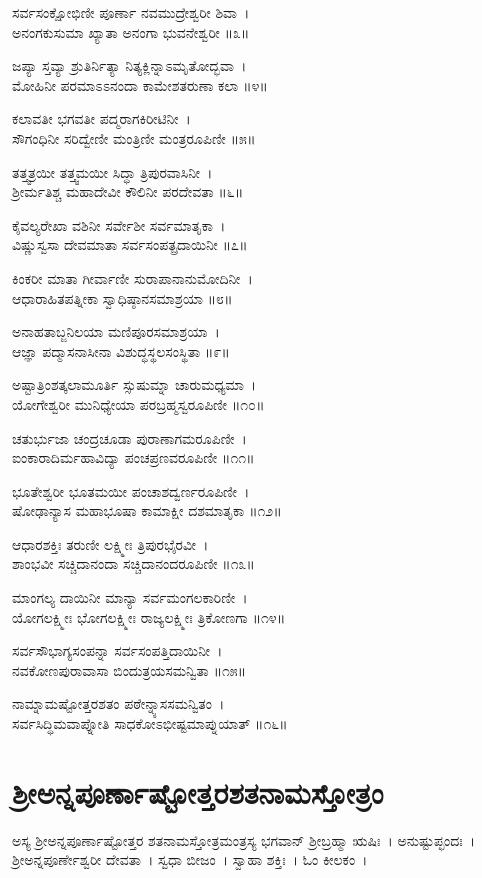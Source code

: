 ಸರ್ವಸಂಕ್ಷೋಭಿಣೀ ಪೂರ್ಣಾ ನವಮುದ್ರೇಶ್ವರೀ ಶಿವಾ~।\\
ಅನಂಗಕುಸುಮಾ ಖ್ಯಾತಾ ಅನಂಗಾ ಭುವನೇಶ್ವರೀ ॥೩॥

ಜಪ್ಯಾ ಸ್ತವ್ಯಾ ಶ್ರುತಿರ್ನಿತ್ಯಾ ನಿತ್ಯಕ್ಲಿನ್ನಾಽಮೃತೋದ್ಭವಾ~।\\
ಮೋಹಿನೀ ಪರಮಾಽಽನಂದಾ ಕಾಮೇಶತರುಣಾ ಕಲಾ ॥೪॥

ಕಲಾವತೀ ಭಗವತೀ ಪದ್ಮರಾಗಕಿರೀಟಿನೀ~।\\
ಸೌಗಂಧಿನೀ ಸರಿದ್ವೇಣೀ ಮಂತ್ರಿಣೀ ಮಂತ್ರರೂಪಿಣೀ ॥೫॥

ತತ್ತ್ವತ್ರಯೀ ತತ್ತ್ವಮಯೀ ಸಿದ್ಧಾ ತ್ರಿಪುರವಾಸಿನೀ~।\\
ಶ್ರೀರ್ಮತಿಶ್ಚ ಮಹಾದೇವೀ ಕೌಲಿನೀ ಪರದೇವತಾ ॥೬॥

ಕೈವಲ್ಯರೇಖಾ ವಶಿನೀ ಸರ್ವೇಶೀ ಸರ್ವಮಾತೃಕಾ~।\\
ವಿಷ್ಣುಸ್ವಸಾ ದೇವಮಾತಾ ಸರ್ವಸಂಪತ್ಪ್ರದಾಯಿನೀ ॥೭॥

ಕಿಂಕರೀ ಮಾತಾ ಗೀರ್ವಾಣೀ ಸುರಾಪಾನಾನುಮೋದಿನೀ~।\\
ಆಧಾರಾಹಿತಪತ್ನೀಕಾ ಸ್ವಾಧಿಷ್ಠಾನಸಮಾಶ್ರಯಾ ॥೮॥

ಅನಾಹತಾಬ್ಜನಿಲಯಾ ಮಣಿಪೂರಸಮಾಶ್ರಯಾ~।\\
ಆಜ್ಞಾ ಪದ್ಮಾಸನಾಸೀನಾ ವಿಶುದ್ಧಸ್ಥಲಸಂಸ್ಥಿತಾ ॥೯॥

ಅಷ್ಟಾತ್ರಿಂಶತ್ಕಲಾಮೂರ್ತಿ ಸ್ಸುಷುಮ್ನಾ ಚಾರುಮಧ್ಯಮಾ~।\\
ಯೋಗೇಶ್ವರೀ ಮುನಿಧ್ಯೇಯಾ ಪರಬ್ರಹ್ಮಸ್ವರೂಪಿಣೀ ॥೧೦॥

ಚತುರ್ಭುಜಾ ಚಂದ್ರಚೂಡಾ ಪುರಾಣಾಗಮರೂಪಿಣೀ~।\\
ಐಂಕಾರಾದಿರ್ಮಹಾವಿದ್ಯಾ ಪಂಚಪ್ರಣವರೂಪಿಣೀ ॥೧೧॥

ಭೂತೇಶ್ವರೀ ಭೂತಮಯೀ ಪಂಚಾಶದ್ವರ್ಣರೂಪಿಣೀ~।\\
ಷೋಢಾನ್ಯಾಸ ಮಹಾಭೂಷಾ ಕಾಮಾಕ್ಷೀ ದಶಮಾತೃಕಾ ॥೧೨॥

ಆಧಾರಶಕ್ತಿಃ ತರುಣೀ ಲಕ್ಷ್ಮೀಃ ತ್ರಿಪುರಭೈರವೀ~।\\
ಶಾಂಭವೀ ಸಚ್ಚಿದಾನಂದಾ ಸಚ್ಚಿದಾನಂದರೂಪಿಣೀ ॥೧೩॥

ಮಾಂಗಲ್ಯ ದಾಯಿನೀ ಮಾನ್ಯಾ ಸರ್ವಮಂಗಲಕಾರಿಣೀ~।\\
ಯೋಗಲಕ್ಷ್ಮೀಃ ಭೋಗಲಕ್ಷ್ಮೀಃ ರಾಜ್ಯಲಕ್ಷ್ಮೀಃ ತ್ರಿಕೋಣಗಾ ॥೧೪॥

ಸರ್ವಸೌಭಾಗ್ಯಸಂಪನ್ನಾ ಸರ್ವಸಂಪತ್ತಿದಾಯಿನೀ~।\\
ನವಕೋಣಪುರಾವಾಸಾ ಬಿಂದುತ್ರಯಸಮನ್ವಿತಾ ॥೧೫॥

ನಾಮ್ನಾಮಷ್ಟೋತ್ತರಶತಂ ಪಠೇನ್ನ್ಯಾಸಸಮನ್ವಿತಂ~।\\
ಸರ್ವಸಿದ್ಧಿಮವಾಪ್ನೋತಿ ಸಾಧಕೋಽಭೀಷ್ಟಮಾಪ್ನುಯಾತ್ ॥೧೬॥
\newpage
\section{ಶ್ರೀಅನ್ನಪೂರ್ಣಾಷ್ಟೋತ್ತರಶತನಾಮಸ್ತೋತ್ರಂ }
ಅಸ್ಯ ಶ್ರೀಅನ್ನಪೂರ್ಣಾಷ್ಟೋತ್ತರ ಶತನಾಮಸ್ತೋತ್ರಮಂತ್ರಸ್ಯ ಭಗವಾನ್ ಶ್ರೀಬ್ರಹ್ಮಾ ಋಷಿಃ~। ಅನುಷ್ಟುಪ್ಛಂದಃ~। ಶ್ರೀಅನ್ನಪೂರ್ಣೇಶ್ವರೀ ದೇವತಾ~। ಸ್ವಧಾ ಬೀಜಂ~। ಸ್ವಾಹಾ ಶಕ್ತಿಃ~। ಓಂ ಕೀಲಕಂ~।

